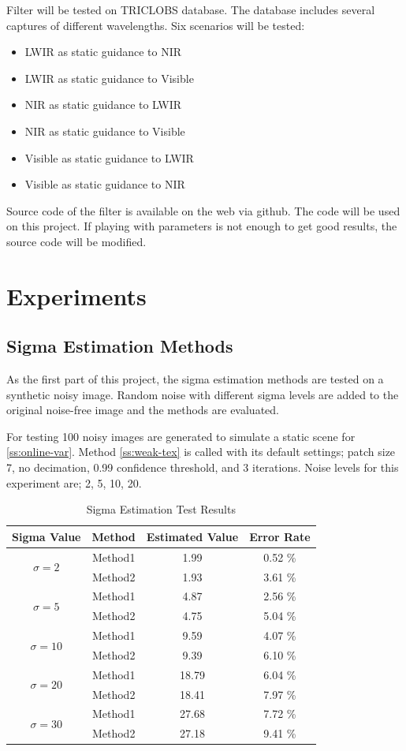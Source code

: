 \documentclass[10pt,twocolumn,letterpaper]{article}
\begin{document}
Filter will be tested on TRICLOBS\cite{triclobs} database. The database includes several captures of different wavelengths. Six scenarios will be tested:
\begin{itemize}
	\item LWIR as static guidance to NIR
	\item LWIR as static guidance to Visible
	\item NIR as static guidance to LWIR
	\item NIR as static guidance to Visible
	\item Visible as static guidance to LWIR
	\item Visible as static guidance to NIR
\end{itemize}

Source code of the filter is available on the web via github\cite{github:sdfilter}. The code will be used on this project. If playing with parameters is not enough to get good results, the source code will be modified.

\section{Experiments}
\subsection{Sigma Estimation Methods}
As the first part of this project, the sigma estimation methods are tested on a synthetic noisy image. Random noise with different sigma levels are added to the original noise-free image and the methods are evaluated.

For testing 100 noisy images are generated to simulate a static scene for \ref{ss:online-var}. Method \ref{ss:weak-tex} is called with its default settings; patch size 7, no decimation, 0.99 confidence threshold, and 3 iterations. Noise levels for this experiment are; 2, 5, 10, 20.

\begin{table}[h!]
	\centering
	\begin{tabular}{cccc}
		\toprule
		Sigma Value & Method & Estimated Value & Error Rate\\
		\midrule
		\multirow{2}{*}{\(\sigma=2\)} & Method1 & 1.99 & 0.52 \% \\
		& Method2 & 1.93 & 3.61 \% \\
		\multirow{2}{*}{\(\sigma=5\)} & Method1 & 4.87 & 2.56 \% \\
		& Method2 & 4.75 & 5.04 \% \\
		\multirow{2}{*}{\(\sigma=10\)} & Method1 & 9.59 & 4.07 \% \\
		& Method2 & 9.39 & 6.10 \% \\
		\multirow{2}{*}{\(\sigma=20\)} & Method1 & 18.79 & 6.04 \% \\
		& Method2 & 18.41 & 7.97 \% \\
		\multirow{2}{*}{\(\sigma=30\)} & Method1 & 27.68 & 7.72 \% \\
		& Method2 & 27.18 & 9.41 \% \\
		\bottomrule
	\end{tabular}
	\caption{Sigma Estimation Test Results}
	\label{tab:sigma-est}
\end{table}
\end{document}
